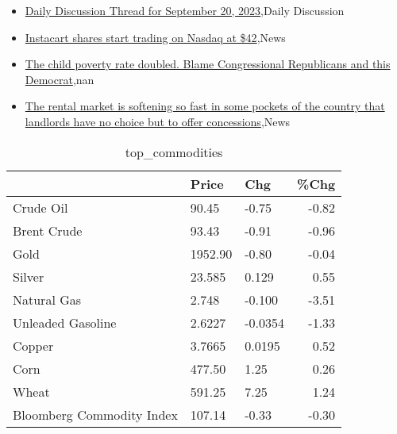 \documentclass{article}%
\begin{document}
%
\begin{itemize}%
\item%
\href{https://reddit.com/r/wallstreetbets/comments/16nhc4a/daily\_discussion\_thread\_for\_september\_20\_2023/}{Daily Discussion Thread for September 20, 2023},Daily Discussion%
\item%
\href{https://reddit.com/r/StockMarket/comments/16mwa5u/instacart\_shares\_start\_trading\_on\_nasdaq\_at\_42/}{Instacart shares start trading on Nasdaq at \$42},News%
\item%
\href{https://reddit.com/r/Economics/comments/16nfh32/the\_child\_poverty\_rate\_doubled\_blame/}{The child poverty rate doubled. Blame Congressional Republicans  and this Democrat},nan%
\item%
\href{https://reddit.com/r/Economics/comments/16n4v01/the\_rental\_market\_is\_softening\_so\_fast\_in\_some/}{The rental market is softening so fast in some pockets of the country that landlords have no choice but to offer concessions},News%
\end{itemize}%


\begin{table}[htbp]%
\caption{top\_commodities}%
\centering%
\begin{adjustbox}{width=1\textwidth}%
\begin{tabular}{lllr}
\toprule
                          &   Price &     Chg &  \%Chg \\
\midrule
               Crude Oil  &   90.45 &   -0.75 & -0.82 \\
             Brent Crude  &   93.43 &   -0.91 & -0.96 \\
                    Gold  & 1952.90 &   -0.80 & -0.04 \\
                  Silver  &  23.585 &   0.129 &  0.55 \\
             Natural Gas  &   2.748 &  -0.100 & -3.51 \\
       Unleaded Gasoline  &  2.6227 & -0.0354 & -1.33 \\
                  Copper  &  3.7665 &  0.0195 &  0.52 \\
                    Corn  &  477.50 &    1.25 &  0.26 \\
                   Wheat  &  591.25 &    7.25 &  1.24 \\
Bloomberg Commodity Index &  107.14 &   -0.33 & -0.30 \\
\bottomrule
\end{tabular}
%
\end{adjustbox}%
\end{table}
\end{document}
